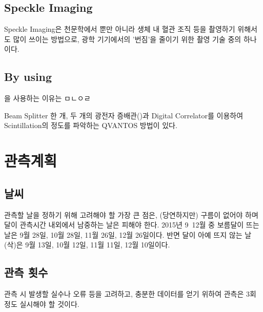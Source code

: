 \documentclass[12pt]{article}
\begin{document}
\subsection{Speckle Imaging} \label{speckle_img}

Speckle Imaging은 천문학에서 뿐만 아니라 생체 내 혈관 조직 등을 촬영하기 위해서도 많이 쓰이는 방법으로, 광학 기기에서의 '번짐'을 줄이기 위한 촬영 기술 중의 하나이다. \cite{speckle_img}

\subsection{By using \PM} \label{photomultiplier}

\PM 을 사용하는 이유는 ㅁㄴㅇㄹ\cite{paterno}

Beam Splitter 한 개, 두 개의 광전자 증배관(\PM)과 Digital Correlator를 이용하여 Scintillation의 정도를 파악하는 QVANTOS 방법이 있다. \cite{AISS.1} 


\section{관측계획}
\subsection{날씨}

관측할 날을 정하기 위해 고려해야 할 가장 큰 점은, (당연하지만) 구름이 없어야 하며 달이 관측시간 내외에서 남중하는 날은 피해야 한다. 2015년 9~12월 중 보름달이 뜨는 날은 9월 28일, 10월 28일, 11월 26일, 12월 26일이다. 반면 달이 아예 뜨지 않는 날(삭)은 9월 13일, 10월 12일, 11월 11일, 12월 10일이다.

\subsection{관측 횟수}

관측 시 발생할 실수나 오류 등을 고려하고, 충분한 데이터를 얻기 위하여 관측은 3회정도 실시해야 할 것이다.
\end{document}

